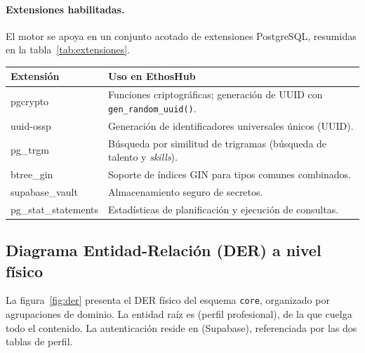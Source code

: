 \paragraph{Extensiones habilitadas.} El motor se apoya en un conjunto acotado de
extensiones PostgreSQL, resumidas en la tabla~\ref{tab:extensiones}.

\clearpage
\vspace{0.2cm}
\noindent
\renewcommand{\arraystretch}{1.3}
\fontsize{9}{10.8}\selectfont\sffamily
\begin{tabularx}{\textwidth}{|>{\ttfamily\color{colorPrimario}}l|X|}
\hline
\rowcolor{headerTabla}
\sffamily\textbf{Extensión} & \sffamily\textbf{Uso en EthosHub} \\
\hline
pgcrypto & Funciones criptográficas; generación de UUID con \texttt{gen\_random\_uuid()}. \\
\hline
\rowcolor{grisTecnico}
uuid-ossp & Generación de identificadores universales únicos (UUID). \\
\hline
pg\_trgm & Búsqueda por similitud de trigramas (búsqueda de talento y \textit{skills}). \\
\hline
\rowcolor{grisTecnico}
btree\_gin & Soporte de índices GIN para tipos comunes combinados. \\
\hline
supabase\_vault & Almacenamiento seguro de secretos. \\
\hline
\rowcolor{grisTecnico}
pg\_stat\_statements & Estadísticas de planificación y ejecución de consultas. \\
\hline
\end{tabularx}
\label{tab:extensiones}

\subsection{Diagrama Entidad-Relación (DER) a nivel físico}
\label{subsec:der}

La figura~\ref{fig:der} presenta el DER físico del esquema \texttt{core}, organizado por
agrupaciones de dominio. La entidad raíz es  (perfil
profesional), de la que cuelga todo el contenido. La autenticación reside en
 (Supabase), referenciada por las dos tablas de perfil.

